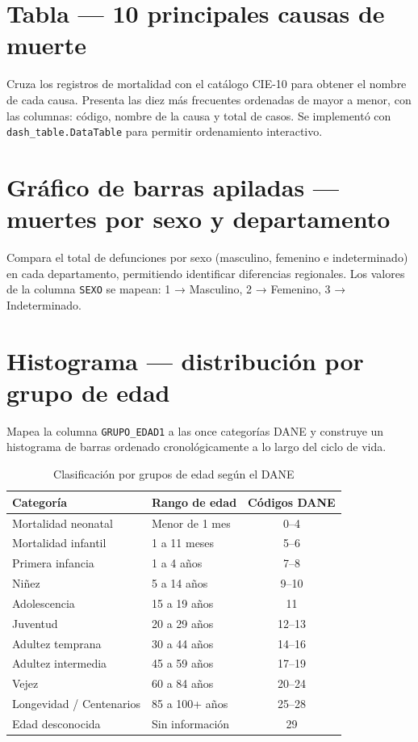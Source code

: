 \documentclass[a4paper,12pt]{report}
\numberwithin{equation}{chapter}
\numberwithin{figure}{chapter}
\numberwithin{table}{chapter}
\begin{document}
\section{Tabla — 10 principales causas de muerte}

Cruza los registros de mortalidad con el catálogo CIE-10 para obtener el nombre de cada causa. Presenta las diez más frecuentes ordenadas de mayor a menor, con las columnas: código, nombre de la causa y total de casos. Se implementó con \texttt{dash\_table.DataTable} para permitir ordenamiento interactivo.

\section{Gráfico de barras apiladas — muertes por sexo y departamento}

Compara el total de defunciones por sexo (masculino, femenino e indeterminado) en cada departamento, permitiendo identificar diferencias regionales. Los valores de la columna \texttt{SEXO} se mapean: 1 → Masculino, 2 → Femenino, 3 → Indeterminado.

\section{Histograma — distribución por grupo de edad}

Mapea la columna \texttt{GRUPO\_EDAD1} a las once categorías DANE y construye un histograma de barras ordenado cronológicamente a lo largo del ciclo de vida.

\begin{table}[H]
    \centering
    \caption{Clasificación por grupos de edad según el DANE}
    \label{tab:edades}
    \begin{tabular}{llc}
        \toprule
        \textbf{Categoría} & \textbf{Rango de edad} & \textbf{Códigos DANE} \\
        \midrule
        Mortalidad neonatal      & Menor de 1 mes    & 0--4   \\
        Mortalidad infantil      & 1 a 11 meses      & 5--6   \\
        Primera infancia         & 1 a 4 años        & 7--8   \\
        Niñez                    & 5 a 14 años       & 9--10  \\
        Adolescencia             & 15 a 19 años      & 11     \\
        Juventud                 & 20 a 29 años      & 12--13 \\
        Adultez temprana         & 30 a 44 años      & 14--16 \\
        Adultez intermedia       & 45 a 59 años      & 17--19 \\
        Vejez                    & 60 a 84 años      & 20--24 \\
        Longevidad / Centenarios & 85 a 100+ años    & 25--28 \\
        Edad desconocida         & Sin información   & 29     \\
        \bottomrule
    \end{tabular}
\end{table}
\end{document}
